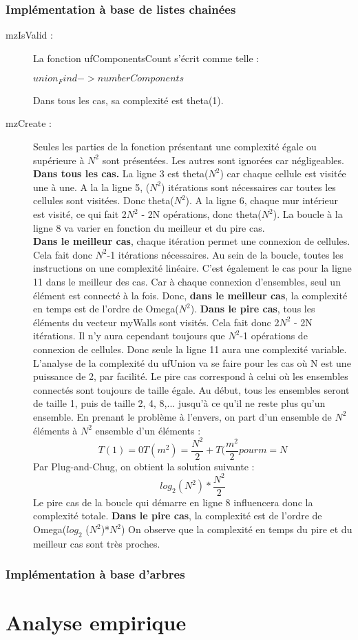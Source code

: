 \documentclass[11pt]{article}
\begin{document}
\subsubsection{Implémentation à base de listes chainées}
\begin{description}
\item[mzIsValid :]La fonction ufComponentsCount s'écrit comme telle :
\begin{codebox}
\li \Return $union_Find->numberComponents$
\end{codebox}
Dans tous les cas, sa complexité est theta(1).

\item[mzCreate :] Seules les parties de la fonction présentant une complexité égale ou supérieure à $N^{2}$ sont présentées. Les autres sont ignorées car négligeables. \textbf{Dans tous les cas.} La ligne 3 est theta($N^{2}$) car chaque cellule est visitée une à une. A la la ligne 5, ($N^{2}$) itérations sont nécessaires car toutes les cellules sont visitées. Donc theta($N^{2}$).
A la ligne 6, chaque mur intérieur est visité, ce qui fait 2$N^{2}$ - 2N opérations, donc theta($N^{2}$).
La boucle à la ligne 8 va varier en fonction du meilleur et du pire cas. \\
\textbf{Dans le meilleur cas}, chaque itération permet une connexion de cellules. Cela fait donc $N^{2}$-1 itérations nécessaires. Au sein de la boucle, toutes les instructions on une complexité linéaire. C'est également le cas pour la ligne 11 dans le meilleur des cas. Car à chaque connexion d'ensembles, seul un élément est connecté à la fois. Donc,\textbf{ dans le meilleur cas}, la complexité en temps est de l'ordre de Omega($N^{2}$).
\textbf{Dans le pire cas}, tous les éléments du vecteur myWalls sont visités. Cela fait donc 2$N^{2}$ - 2N  itérations. Il n'y aura cependant toujours que $N^{2}$-1 opérations de connexion de cellules. Donc seule la ligne 11 aura une complexité variable. L'analyse de la complexité du ufUnion va se faire pour les cas où N est une puissance de 2, par facilité. Le pire cas correspond à celui où les ensembles connectés sont toujours de taille égale. Au début, tous les ensembles seront de taille 1, puis de taille 2, 4, 8,... jusqu'à ce qu'il ne reste plus qu'un ensemble. En prenant le problème à l'envers, on part d'un ensemble de $N^{2}$ éléments à $N^{2}$ ensemble d'un éléments :
\begin{equation}
	T(1) = 0
	T(m^{2}) = \frac{N^{2}}{2} + T(\frac{m^{2}}{2} pour m = N
\end{equation}
Par Plug-and-Chug, on obtient la solution suivante :
\begin{equation}
	log_{2} (N^{2}) * \frac{N^{2}}{2}
\end{equation}
Le pire cas de la boucle qui démarre en ligne 8 influencera donc la complexité totale.
\textbf{Dans le pire cas}, la complexité est de l'ordre de Omega($log_{2}$ ($N^{2}$)*$N^{2}$)
On observe que la complexité en temps du pire et du meilleur cas sont très proches.
\end{description}


\subsubsection{Implémentation à base d'arbres}

\section{Analyse empirique}
\end{document}
